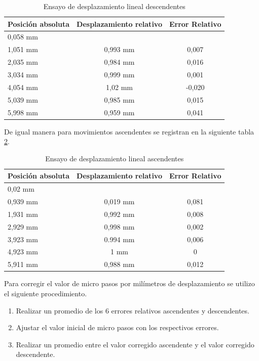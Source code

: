 \begin{table}[h]
	\centering
	\caption[Ensayo de desplazamiento]{Ensayo de desplazamiento lineal descendentes}
	\begin{tabular}{l c c }    
		\toprule
		\textbf{Posición absoluta}     & \textbf{Desplazamiento relativo} & \textbf{Error Relativo} \\
		\midrule
		0,058 mm	& 	        	& 	 			 	\\		
		1,051 mm    & 	0,993 mm    	& 	0,007				\\
		2,035 mm 	& 	0,984 mm	    & 	0,016 				\\
		3,034 mm	& 	0,999 mm	    & 	0,001 			\\
		4,054 mm 	& 	1,02 mm         & 	-0,020					\\
		5,039 mm 	& 	0,985 mm	    & 	0,015					\\
		5,998 mm 	& 	0,959 mm        & 	0,041 			\\
		\bottomrule
		\hline
	\end{tabular}
	\label{tab:ensayo_desplazamiento_des}
\end{table}

De igual manera para movimientos ascendentes se registran en la siguiente tabla \ref{tab:ensayo_desplazamiento_asc}.
 
\begin{table}[h]
	\centering
	\caption[Ensayo de desplazamiento]{Ensayo de desplazamiento lineal ascendentes}
	\begin{tabular}{l c c }    
		\toprule
		\textbf{Posición absoluta}     & \textbf{Desplazamiento relativo} & \textbf{Error Relativo} \\
		\midrule
		0,02 mm	& 	        	& 	 			 	\\		
		0,939 mm    & 	0,019 mm    	& 	0,081	\\
		1,931 mm 	& 	0,992 mm	    & 	0,008 	\\
		2,929 mm	& 	0,998 mm	    & 	0,002 	\\
		3,923 mm 	& 	0.994 mm        & 	0,006	\\
		4,923 mm 	& 	1 mm	    	& 	0		\\
		5,911 mm 	& 	0,988 mm        & 	0,012 	\\
		\bottomrule
		\hline
	\end{tabular}
	\label{tab:ensayo_desplazamiento_asc}
\end{table}


Para corregir el valor de micro pasos por milímetros de desplazamiento se utilizo el siguiente procedimiento.
\begin{enumerate}
\item Realizar un promedio de los 6 errores relativos ascendentes y descendentes.
\item Ajustar el valor inicial de micro pasos con los respectivos errores. 
\item Realizar un promedio entre el valor corregido ascendente y el valor corregido descendente.
\end{enumerate}


